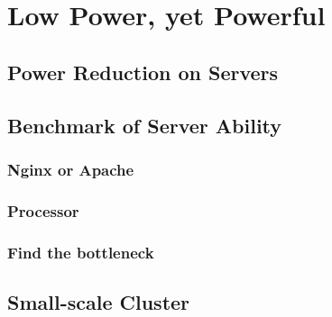 \chapter{Low Power, yet Powerful}\label{benchmark}
\section{Power Reduction on Servers}

\section{Benchmark of Server Ability}
\subsection{Nginx or Apache}
\subsection{Processor}
\subsection{Find the bottleneck}

\section{Small-scale Cluster}